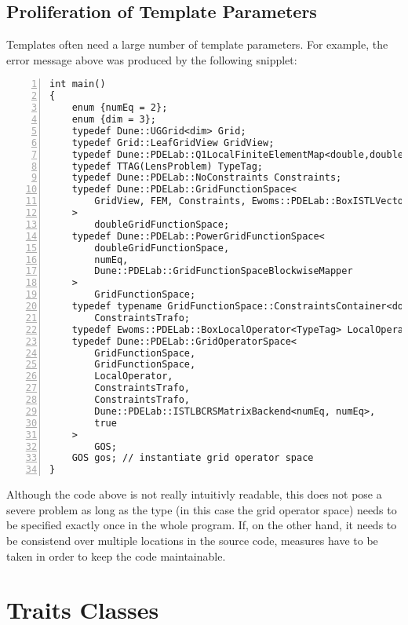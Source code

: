 \subsection*{Proliferation of Template Parameters}

Templates often need a large number of template parameters. For
example, the error message above was produced by the following
snipplet:
\begin{lstlisting}[basicstyle=\ttfamily\scriptsize,numbers=left,numberstyle=\tiny, numbersep=5pt]
int main()
{
    enum {numEq = 2};
    enum {dim = 3};
    typedef Dune::UGGrid<dim> Grid;
    typedef Grid::LeafGridView GridView;
    typedef Dune::PDELab::Q1LocalFiniteElementMap<double,double,dim> FEM;
    typedef TTAG(LensProblem) TypeTag;
    typedef Dune::PDELab::NoConstraints Constraints;
    typedef Dune::PDELab::GridFunctionSpace<
        GridView, FEM, Constraints, Ewoms::PDELab::BoxISTLVectorBackend<TypeTag>
    >
        doubleGridFunctionSpace;
    typedef Dune::PDELab::PowerGridFunctionSpace<
        doubleGridFunctionSpace,
        numEq,
        Dune::PDELab::GridFunctionSpaceBlockwiseMapper
    >
        GridFunctionSpace;
    typedef typename GridFunctionSpace::ConstraintsContainer<double>::Type
        ConstraintsTrafo;
    typedef Ewoms::PDELab::BoxLocalOperator<TypeTag> LocalOperator;
    typedef Dune::PDELab::GridOperatorSpace<
        GridFunctionSpace,
        GridFunctionSpace,
        LocalOperator,
        ConstraintsTrafo,
        ConstraintsTrafo,
        Dune::PDELab::ISTLBCRSMatrixBackend<numEq, numEq>,
        true
    >
        GOS;
    GOS gos; // instantiate grid operator space
}
\end{lstlisting}

Although the code above is not really intuitivly readable, this does
not pose a severe problem as long as the type (in this case the grid
operator space) needs to be specified exactly once in the whole
program. If, on the other hand, it needs to be consistend over
multiple locations in the source code, measures have to be taken in
order to keep the code maintainable.

\section{Traits Classes}

